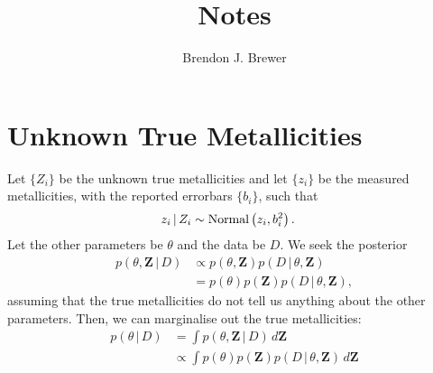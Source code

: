 \documentclass[a4paper, 12pt]{article}
\title{Notes}
\author{Brendon J. Brewer}
\date{}
\newcommand{\given}{\,|\,}
\begin{document}
\maketitle

\abstract{}

\setlength{\parindent}{0pt}
\setlength{\parskip}{8pt}

\section*{Unknown True Metallicities}
Let $\{Z_i\}$ be the unknown true metallicities and let $\{z_i\}$ be the
measured metallicities, with the reported errorbars $\{b_i\}$, such that
\begin{align}
z_i \given Z_i &\sim \textnormal{Normal}\left(z_i, b_i^2\right).
\end{align}
Let the other parameters be $\theta$ and the data be $D$. We seek the
posterior
\begin{align}
p(\theta, \boldsymbol{Z} \given D) &\propto p(\theta, \boldsymbol{Z})
                                            p(D \given \theta, \boldsymbol{Z}) \\
    &= p(\theta)p(\boldsymbol{Z}) p(D \given \theta, \boldsymbol{Z}),
\end{align}
assuming that the true metallicities do not tell us anything about the other
parameters. Then, we can marginalise out the true metallicities:
\begin{align}
p(\theta \given D)
    &= \int p(\theta, \boldsymbol{Z} \given D) \, d\boldsymbol{Z} \\
    &\propto \int p(\theta)p(\boldsymbol{Z}) p(D \given \theta, \boldsymbol{Z})
               \, d\boldsymbol{Z} 
\end{align}
\end{document}
